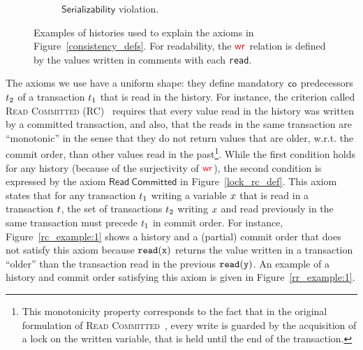 \begin{figure}
\begin{subfigure}{.32\textwidth}
{\begin{tikzpicture}[->,>=stealth',shorten >=1pt,auto,node distance=3cm,
 semithick, transform shape]
\end{tikzpicture}  
}
 \caption{$\mathsf{Serializability}$ violation.}
 \label{ser_example:1}
\end{subfigure}

  \caption{Examples of histories used to explain the axioms in Figure~\ref{consistency_defs}. For readability, the $\wro$ relation is defined by the values written in comments with each {\tt read}.}
  \label{counter_example:1}
\vspace{-3mm}
\end{figure}

The axioms we use have a uniform shape: they define mandatory $\co$ predecessors $\tr_2$ of a transaction $\tr_1$ that is read in the history. For instance, the criterion called \textsc{Read Committed} (RC)~\cite{DBLP:conf/sigmod/BerensonBGMOO95} requires that every value read in the history was written by a committed transaction, and also, that the reads in the same transaction are ``monotonic'' in the sense that they do not return values that are older, w.r.t. the commit order, than other values read in the past\footnote{This monotonicity property corresponds to the fact that in the original formulation of \textsc{Read Committed}~\cite{DBLP:conf/sigmod/BerensonBGMOO95}, every write is guarded by the acquisition of a lock on the written variable, that is held until the end of the transaction.}. While the first condition holds for any history (because of the surjectivity of $\wro$), the second condition is expressed by the axiom $\mathsf{Read\ Committed}$ in Figure~\ref{lock_rc_def}. This axiom states that for any transaction $\tr_1$ writing a variable $\xvar$ that is read in a transaction $\tr$, the set of transactions $\tr_2$ writing $\xvar$ and read previously in the same transaction must precede $\tr_1$ in commit order. For instance, Figure~\ref{rc_example:1} shows a history and a (partial) commit order that does not satisfy this axiom because ${\tt read(x)}$ returns the value written in a transaction ``older'' than the transaction read in the previous ${\tt read(y)}$. An example of a history and commit order satisfying this axiom is given in Figure~\ref{rr_example:1}.

